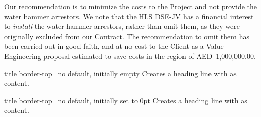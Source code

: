  Our recommendation is to minimize the costs to the Project and not provide the water hammer arrestors. We note that the HLS DSE-JV has a financial interest to \textit{install} the water hammer arrestors, rather than omit them,  as they were originally excluded from our Contract. The recommendation to omit them has been carried out in good faith, and at no cost to the Client as a Value Engineering proposal estimated to save costs in the region of AED~1,000,000.00.


\begin{docKey}[phd]{title border-top}{=}{no default, initially empty}
Creates a heading line with  as content.
\end{docKey}

\begin{docKey}[]{title border-top}{=}{no default, initially set to 0pt}
Creates a heading line with  as content.
\end{docKey}